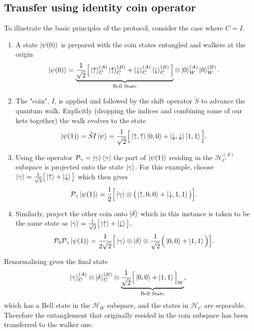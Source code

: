 \subsection{Transfer using identity coin operator}
\label{subsection:qw_transfer}
To illustrate the basic principles of the protocol, consider the case where $C = I$.
\begin{enumerate}
    \item A state $\ket{\psi(0)}$ is prepared with the coin states entangled and walkers at the origin
    \begin{equation}
        \ket{\psi(0)} = \underbrace{\frac{1}{\sqrt{2}}\Big [\ket{\uparrow}^{(A)}_C\ket{\uparrow}^{(B)}_C + \ket{\downarrow}^{(A)}_C\ket{\downarrow}^{(B)}_C \Big]}_{\text{Bell State}}\otimes \ket{0}^{(A)}_W\ket{0}^{(B)}_W.
    \end{equation}
    \item The "coin", $I$, is applied and followed by the shift operator $\tilde{S}$ to advance the quantum walk.
    Explicitly (dropping the indices and combining some of our kets together) the walk evolves to the state
    \begin{equation}
        \ket{\psi(1)} = \tilde{S}I\ket{\psi} = \frac{1}{\sqrt{2}}\Big [\ket{\uparrow,\uparrow}\ket{0,0} + \ket{\downarrow,\downarrow}\ket{1,1}\Big].
    \end{equation}
    \item Using the operator $\mathcal{P}_{\gamma} = \ket{\gamma}\bra{\gamma}$ the part of $\ket{\psi(1)}$ residing in the $\mathcal{H}^{(A)}_C$ subspace is projected onto the state $\ket{\gamma}$. \newline
    For this example, choose $\ket{\gamma} = \frac{1}{\sqrt{2}} \big [\ket{\uparrow} + \ket{\downarrow} \big]$ which then gives
    \begin{equation}
        \mathcal{P}_\gamma \ket{\psi(1)} = \frac{1}{2}\Big [\ket{\gamma}\otimes \big (\ket{\uparrow, 0, 0} + \ket{\downarrow, 1, 1}\big )\Big ].
    \end{equation}
    \item Similarly, project the other coin onto $\ket{\delta}$ which in this instance is taken to be the same state as $\ket{\gamma} = \frac{1}{\sqrt{2}} \big [\ket{\uparrow} + \ket{\downarrow} \big]$,
    \begin{equation}
        \mathcal{P}_\delta \mathcal{P}_\gamma \ket{\psi(1)} = \frac{1}{2\sqrt{2}}\Big [\ket{\gamma}\otimes \ket{\delta} \otimes \frac{1}{\sqrt{2}}\Big (\ket{0, 0} + \ket{1, 1}\Big )\Big ].
    \end{equation}
\end{enumerate}
Renormalising gives the final state
\begin{equation}
    \label{equation:qw_transfer_1_final}
    \ket{\gamma}^{(A)}_C \otimes \ket{\delta}^{(B)}_C \otimes \underbrace{\frac{1}{\sqrt{2}}\Big [\ket{0, 0} + \ket{1, 1}\Big ]_W}_{\text{Bell State}},
\end{equation}
which has a Bell state in the $\mathcal{H}_W$ subspace, and the states in $\mathcal{H}_C$ are separable.
Therefore the entanglement that originally resided in the coin subspace has been transferred to the walker one.

